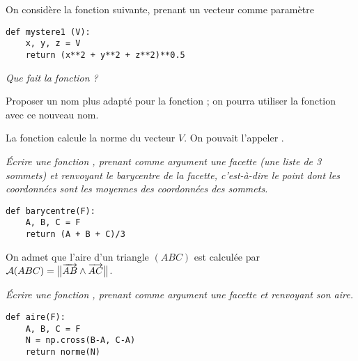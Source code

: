 On considère la fonction suivante, prenant un vecteur comme paramètre
\begin{lstlisting}
def mystere1 (V):
    x, y, z = V
    return (x**2 + y**2 + z**2)**0.5
\end{lstlisting}
\begin{Exercise}\it 
Que fait la fonction  ?

Proposer un nom plus adapté pour la fonction ; on pourra utiliser la fonction avec ce nouveau nom.
\end{Exercise}
\begin{Answer}

La fonction calcule la norme du vecteur $V$. On pouvait l'appeler .
\end{Answer}
\begin{Exercise}\it 
Écrire une fonction , prenant comme argument une facette  (une liste de 3 sommets) et renvoyant le barycentre de la facette, c'est-à-dire le point dont les coordonnées sont les moyennes des coordonnées des sommets.
\end{Exercise}
\begin{Answer}
\begin{lstlisting}
def barycentre(F):
    A, B, C = F
    return (A + B + C)/3
\end{lstlisting}
\end{Answer}

\medskip

On admet que l'aire d'un triangle $(ABC)$ est calculée par ${\cal A}(ABC)=\bigl\|\overrightarrow{AB} \wedge \overrightarrow{AC}\bigr\|$.
\begin{Exercise}\it 
Écrire une fonction , prenant comme argument une facette  et renvoyant son aire.
\end{Exercise}
\begin{Answer}
\begin{lstlisting}
def aire(F):
    A, B, C = F
    N = np.cross(B-A, C-A)
    return norme(N)
\end{lstlisting}
\end{Answer}

